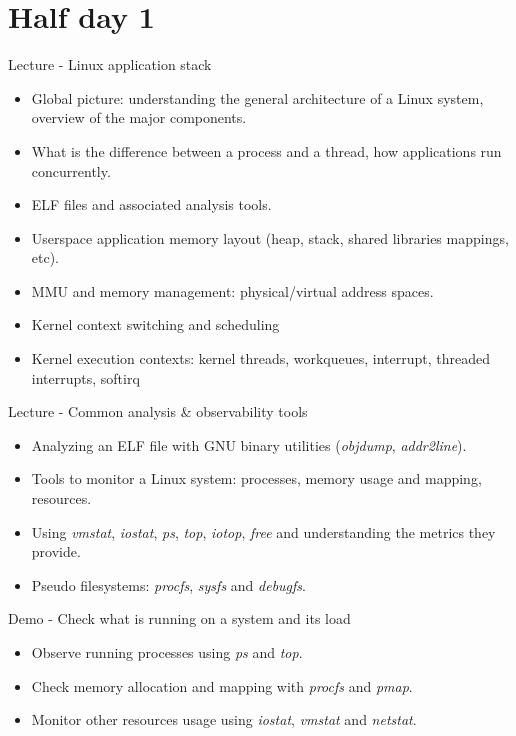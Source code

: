 \documentclass[a4paper,12pt,obeyspaces,spaces,hyphens]{article}
\begin{document}
\section{Half day 1}

\feagendaonecolumn
{Lecture - Linux application stack}
{
  \begin{itemize}
  \item Global picture: understanding the general architecture of a
        Linux system, overview of the major components.
  \item What is the difference between a process and a thread, how
    applications run concurrently.
  \item ELF files and associated analysis tools.
  \item Userspace application memory layout (heap, stack, shared
    libraries mappings, etc).
  \item MMU and memory management: physical/virtual address spaces.
  \item Kernel context switching and scheduling
  \item Kernel execution contexts: kernel threads, workqueues,
    interrupt, threaded interrupts, softirq
  \end{itemize}
}

\feagendaonecolumn
{Lecture - Common analysis \& observability tools}
{
  \begin{itemize}
  \item Analyzing an ELF file with GNU binary utilities
    ({\em objdump}, {\em addr2line}).
  \item Tools to monitor a Linux system: processes, memory
    usage and mapping, resources.
  \item Using {\em vmstat}, {\em iostat}, {\em ps}, {\em top}, {\em
      iotop}, {\em free} and understanding the metrics they provide.
  \item Pseudo filesystems: {\em procfs}, {\em sysfs} and {\em
      debugfs}.
  \end{itemize}
}

\feagendaonecolumn
{Demo - Check what is running on a system and its load}
{
  \begin{itemize}
  \item Observe running processes using {\em ps} and {\em top}.
  \item Check memory allocation and mapping with {\em procfs} and {\em
      pmap}.
  \item Monitor other resources usage using {\em iostat}, {\em vmstat}
    and {\em netstat}.
  \end{itemize}
}
\end{document}
